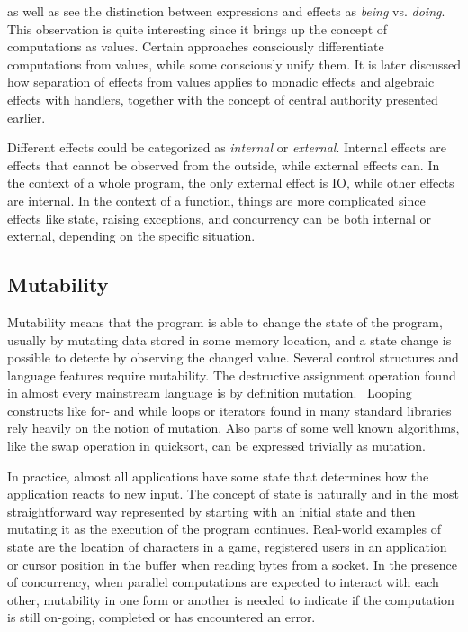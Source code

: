 \textcite{imperative-fp} as well as \textcite{do-be-do-be-do} see the distinction between expressions and effects as \textit{being} vs. \textit{doing}. This observation is quite interesting since it brings up the concept of computations as values. Certain approaches consciously differentiate computations from values, while some consciously unify them. It is later discussed how separation of effects from values applies to monadic effects and algebraic effects with handlers, together with the concept of central authority presented earlier.

Different effects could be categorized as \textit{internal} or \textit{external}. Internal effects are effects that cannot be observed from the outside, while external effects can. In the context of a whole program, the only external effect is IO, while other effects are internal. In the context of a function, things are more complicated since effects like state, raising exceptions, and concurrency can be both internal or external, depending on the specific situation.



\subsection{Mutability} %
Mutability means that the program is able to change the state of the program, usually by mutating data stored in some memory location, and a state change is possible to detecte by observing the changed value. Several control structures and language features require mutability. The destructive assignment operation found in almost every mainstream language is by definition mutation.~\cite[Chapter~3]{sicp} Looping constructs like for- and while loops or iterators found in many standard libraries rely heavily on the notion of mutation. Also parts of some well known algorithms, like the swap operation in quicksort, can be expressed trivially as mutation.

In practice, almost all applications have some state that determines how the application reacts to new input. The concept of state is naturally and in the most straightforward way represented by starting with an initial state and then mutating it as the execution of the program continues. Real-world examples of state are the location of characters in a game, registered users in an application or cursor position in the buffer when reading bytes from a socket. In the presence of concurrency, when parallel computations are expected to interact with each other, mutability in one form or another is needed to indicate if the computation is still on-going, completed or has encountered an error.


